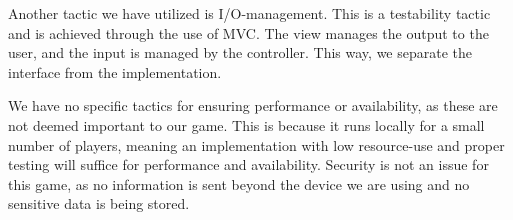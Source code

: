 Another tactic we have utilized is I/O-management. This is a testability tactic and is achieved through the use of MVC. The view manages the output to the user, and the input is managed by the controller. This way, we separate the interface from the implementation.

We have no specific tactics for ensuring performance or availability, as these are not deemed important to our game. This is because it runs locally for a small number of players, meaning an implementation with low resource-use and proper testing will suffice for performance and availability. Security is not an issue for this game, as no information is sent beyond the device we are using and no sensitive data is being stored.